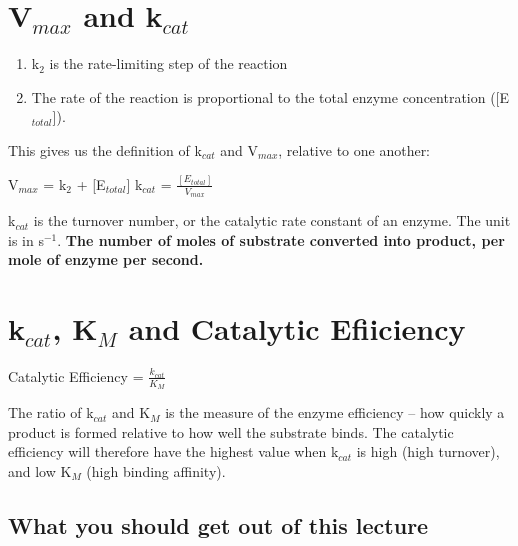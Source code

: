 \section{V$_{max}$ and k$_{cat}$}

\begin{center}
\end{center}

\begin{enumerate}
\item k$_2$ is the rate-limiting step of the reaction
\item The rate of the reaction is proportional to the total enzyme concentration ([E$_{total}$]).
\end{enumerate}

This gives us the definition of k$_{cat}$ and V$_{max}$, relative to one another:

\begin{center}
V$_{max}$ = k$_2$ + [E$_{total}$] \ch{->} k$_{cat}$ = $\frac{[E_{total}]}{V_{max}}$
\end{center}

k$_{cat}$ is the turnover number, or the catalytic rate constant of an enzyme.
The unit is in s$^{-1}$.
\textbf{The number of moles of substrate converted into product, per mole of enzyme per second.}

\section{k$_{cat}$, K$_M$ and Catalytic Efiiciency}

\begin{center}
Catalytic Efficiency = $\frac{k_{cat}}{K_M}$
\end{center}

The ratio of k$_{cat}$ and K$_M$ is the measure of the enzyme efficiency -- how quickly a product is formed relative to how well the substrate binds.
The catalytic efficiency will therefore have the highest value when k$_{cat}$ is high (high turnover), and low K$_M$ (high binding affinity).

\subsection*{What you should get out of this lecture}

